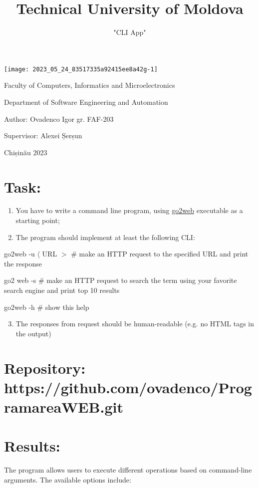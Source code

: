 \documentclass[10pt]{article}
\title{Technical University of Moldova }
\author{"CLI App"}
\date{}
\begin{document}
\maketitle
\begin{center}
\texttt{[image: 2023\_05\_24\_83517335a92415ee8a42g-1]}
\end{center}

Faculty of Computers, Informatics and Microelectronics

Department of Software Engineering and Automation

Author: Ovadenco Igor gr. FAF-203

Supervisor: Alexei Șerșun

Chișinău 2023

\section{Task:}
\begin{enumerate}
  \item You have to write a command line program, using \href{go2web}{go2web} executable as a starting point;

  \item The program should implement at least the following CLI:

\end{enumerate}

go2web -u $\langle$ URL $>$ \# make an HTTP request to the specified URL and print the response

go2 web -s  \# make an HTTP request to search the term using your favorite search engine and print top 10 results

go2web -h \# show this help

\begin{enumerate}
  \setcounter{enumi}{2}
  \item The responses from request should be human-readable (e.g. no HTML tags in the output)
\end{enumerate}

\section{Repository: https://github.com/ovadenco/ProgramareaWEB.git}
\section{Results:}
The program allows users to execute different operations based on command-line arguments. The available options include:
\end{document}
